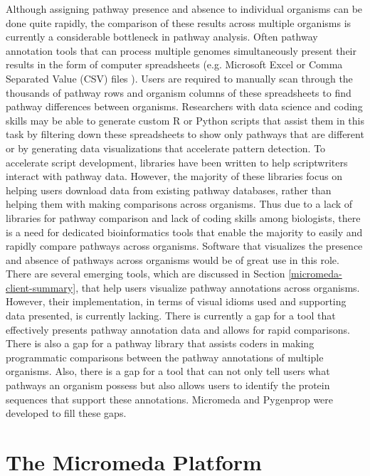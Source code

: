 Although assigning pathway presence and absence to individual organisms can be done quite rapidly, the comparison of these results across multiple organisms is currently a considerable bottleneck in pathway analysis. Often pathway annotation tools that can process multiple genomes simultaneously present their results in the form of computer spreadsheets (e.g. Microsoft Excel or Comma Separated Value (CSV) files \cite{RFC4180}). Users are required to manually scan through the thousands of pathway rows and organism columns of these spreadsheets to find pathway differences between organisms. Researchers with data science and coding skills may be able to generate custom R or Python scripts that assist them in this task by filtering down these spreadsheets to show only pathways that are different or by generating data visualizations that accelerate pattern detection. To accelerate script development, libraries have been written to help scriptwriters interact with pathway data. However, the majority of these libraries focus on helping users download data from existing pathway databases, rather than helping them with making comparisons across organisms. Thus due to a lack of libraries for pathway comparison and lack of coding skills among biologists, there is a need for dedicated bioinformatics tools that enable the majority to easily and rapidly compare pathways across organisms. Software that visualizes the presence and absence of pathways across organisms would be of great use in this role. There are several emerging tools, which are discussed in Section \ref{micromeda-client-summary}, that help users visualize pathway annotations across organisms. However, their implementation, in terms of visual idioms used and supporting data presented, is currently lacking. There is currently a gap for a tool that effectively presents pathway annotation data and allows for rapid comparisons. There is also a gap for a pathway library that assists coders in making programmatic comparisons between the pathway annotations of multiple organisms. Also, there is a gap for a tool that can not only tell users what pathways an organism possess but also allows users to identify the protein sequences that support these annotations. Micromeda and Pygenprop were developed to fill these gaps.

\section{The Micromeda Platform}

